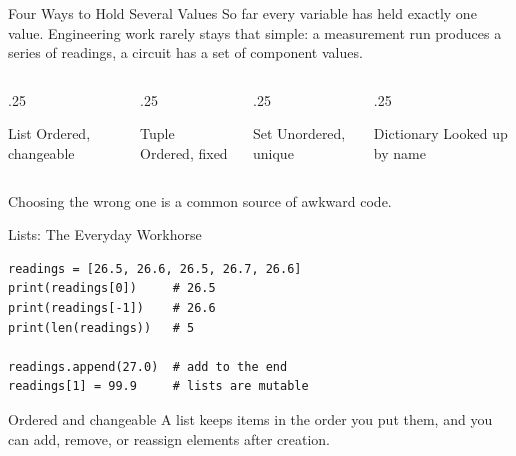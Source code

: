 \documentclass[9pt,aspectratio=169,xcolor=table]{beamer}
\begin{document}
\begin{frame}{Four Ways to Hold Several Values}
    \leavevmode
    So far every variable has held exactly one value. Engineering work
    rarely stays that simple: a measurement run produces a series of
    readings, a circuit has a set of component values.

    \vspace{3mm}
    \begin{columns}[t]
        \begin{column}{.25\textwidth}
            \begin{block}{\small List}
                \scriptsize Ordered, changeable
            \end{block}
        \end{column}
        \begin{column}{.25\textwidth}
            \begin{block}{\small Tuple}
                \scriptsize Ordered, fixed
            \end{block}
        \end{column}
        \begin{column}{.25\textwidth}
            \begin{block}{\small Set}
                \scriptsize Unordered, unique
            \end{block}
        \end{column}
        \begin{column}{.25\textwidth}
            \begin{block}{\small Dictionary}
                \scriptsize Looked up by name
            \end{block}
        \end{column}
    \end{columns}

    \vspace{3mm}
    {\small Choosing the wrong one is a common source of awkward code.}
\end{frame}

\begin{frame}[fragile]{Lists: The Everyday Workhorse}
    \leavevmode
\begin{lstlisting}
readings = [26.5, 26.6, 26.5, 26.7, 26.6]
print(readings[0])     # 26.5
print(readings[-1])    # 26.6
print(len(readings))   # 5

readings.append(27.0)  # add to the end
readings[1] = 99.9     # lists are mutable
\end{lstlisting}

    \vspace{2mm}
    \begin{block}{Ordered and changeable}
        A list keeps items in the order you put them, and you can add,
        remove, or reassign elements after creation.
    \end{block}
\end{frame}
\end{document}
